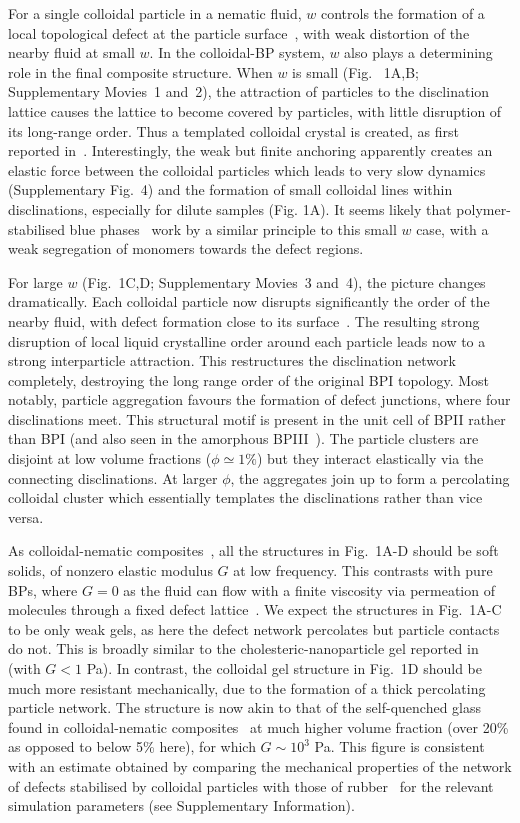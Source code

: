 \documentclass[12pt]{article}
\begin{document}
For a single colloidal particle in a nematic fluid, $w$ controls the formation of a local topological defect at the particle surface~\cite{stark}, with weak distortion of the nearby fluid at small $w$. In the colloidal-BP system, $w$ also plays a determining role in the final composite structure. When $w$ is small (Fig.~ 1A,B; Supplementary Movies~1 and~2), the attraction of particles to the disclination lattice causes
 the lattice to become covered by particles, with little disruption of its
 long-range order. Thus a templated colloidal crystal is created, as first reported in~\cite{miha}. Interestingly, the weak but finite anchoring apparently creates an elastic force between the colloidal particles which leads to very slow dynamics
(Supplementary Fig.~4) and the formation of small colloidal lines within disclinations, especially for dilute samples (Fig. 1A). It seems likely that polymer-stabilised  blue phases~\cite{kikuchi} work by a similar principle to this small $w$ case, with a weak segregation of monomers towards the defect regions.

For large $w$ (Fig.~1C,D; Supplementary Movies~3 and~4), the picture changes
dramatically.
Each colloidal particle now disrupts significantly the order of the nearby fluid, with defect formation close to its surface~\cite{stark}. The resulting strong disruption of local liquid crystalline order around each particle leads now to 
a strong interparticle attraction. This restructures the disclination
network completely, destroying the long range order of
the original BPI topology. Most notably, particle aggregation favours
the formation of defect junctions, where four disclinations meet. This structural motif is present in the unit cell of BPII rather than BPI (and also seen in the amorphous BPIII~\cite{bp3}). The particle clusters are disjoint at low volume fractions ($\phi\simeq 1\%$) but they interact elastically via the connecting disclinations. At larger $\phi$, the aggregates join up to form a percolating colloidal cluster which essentially templates the disclinations rather than vice versa. 

As colloidal-nematic composites~\cite{tiffany}, all the structures in
Fig.~1A-D 
should be soft solids, of nonzero elastic 
modulus $G$ at low frequency. This contrasts with pure BPs, where
$G=0$ as the fluid can flow with a finite
viscosity via permeation of molecules through a fixed defect lattice~\cite{permeation1,permeation2}. We expect the
structures in Fig.~1A-C to be only weak gels, as here the 
defect network percolates but particle contacts do not. This is broadly similar to the cholesteric-nanoparticle gel reported
in~\cite{lubensky} (with $G<1$ Pa). In contrast, the colloidal gel
structure in Fig.~1D should be much more resistant mechanically, 
due to the formation of a thick percolating particle network. The 
structure is now akin to that of the self-quenched glass found in 
colloidal-nematic composites~\cite{tiffany} at much higher volume 
fraction (over 20\% as opposed to below 5\% here), for which $G\sim 10^3$ Pa.
This figure is consistent with an estimate obtained by comparing
the mechanical properties of the network of defects stabilised by
colloidal particles with those of rubber~\cite{ramos} for
the relevant simulation parameters (see Supplementary Information).
\end{document}
